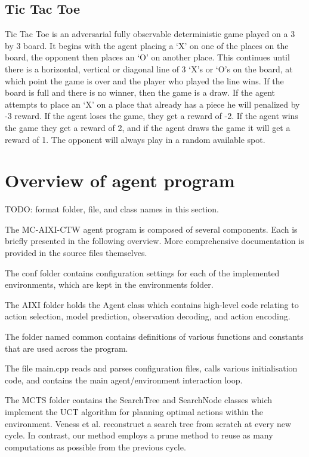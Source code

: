 \documentclass{article}
\theoremstyle{definition}
\newtheorem{primary statistics}[definition]{Primary Statistics}
\newtheorem{auxiliary statistics}[definition]{Auxiliary Statistics}
\begin{document}
\subsection{Tic Tac Toe}
Tic Tac Toe is an adversarial fully observable deterministic game played on a 3 by 3 board. It begins with the agent placing a ‘X’ on one of the places on the board, the opponent then places an ‘O’ on another place. This continues until there is a horizontal, vertical or diagonal line of 3 ‘X’s or ‘O’s on the board, at which point the game is over and the player who played the line wins. If the board is full and there is no winner, then the game is a draw. If the agent attempts to place an ‘X’ on a place that already has a piece he will penalized by -3 reward. If the agent loses the game, they get a reward of -2. If the agent wins the game they get a reward of 2, and if the agent draws the game it will get a reward of 1. The opponent will always play in a random available spot.


\section{Overview of agent program}
TODO: format folder, file, and class names in this section.

The MC-AIXI-CTW agent program is composed of several components. Each is briefly presented in the following overview. More comprehensive documentation is provided in the source files themselves.

The conf folder contains configuration settings for each of the implemented environments, which are kept in the environments folder. 

The AIXI folder holds the Agent class which contains high-level code relating to action selection, model prediction, observation decoding, and action encoding.

The folder named common contains definitions of various functions and constants that are used across the program. 

The file main.cpp reads and parses configuration files, calls various initialisation code, and contains the main agent/environment interaction loop.

The MCTS folder contains the SearchTree and SearchNode classes which implement the UCT algorithm for planning optimal actions within the environment. Veness et al. reconstruct a search tree from scratch at every new cycle. In contrast, our method employs a prune method to reuse as many computations as possible from the previous cycle.
\end{document}
